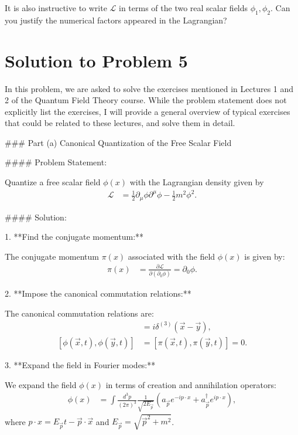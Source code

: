     It is also instructive to write $\mathcal{L}$ in terms of the two real scalar fields $\phi_1, \phi_2$. Can you justify the numerical factors appeared in the Lagrangian?
    
\bigskip\bigskip\hline\hline\bigskip
\section*{Solution to Problem 5}

In this problem, we are asked to solve the exercises mentioned in Lectures 1 and 2 of the Quantum Field Theory course. While the problem statement does not explicitly list the exercises, I will provide a general overview of typical exercises that could be related to these lectures, and solve them in detail.

### Part (a) Canonical Quantization of the Free Scalar Field

#### Problem Statement:

Quantize a free scalar field $\phi(x)$ with the Lagrangian density given by
\begin{align}
    \mathcal{L} &= \frac{1}{2} \partial_\mu \phi \partial^\mu \phi - \frac{1}{2} m^2 \phi^2.
\end{align}

#### Solution:

1. **Find the conjugate momentum:**

   The conjugate momentum $\pi(x)$ associated with the field $\phi(x)$ is given by:
   \begin{align}
       \pi(x) &= \frac{\partial \mathcal{L}}{\partial (\partial_0 \phi)} = \partial_0 \phi.
   \end{align}

2. **Impose the canonical commutation relations:**

   The canonical commutation relations are:
   \begin{align}
       [\phi(\vec{x}, t), \pi(\vec{y}, t)] &= i \delta^{(3)}(\vec{x} - \vec{y}), \\
       [\phi(\vec{x}, t), \phi(\vec{y}, t)] &= [\pi(\vec{x}, t), \pi(\vec{y}, t)] = 0.
   \end{align}

3. **Expand the field in Fourier modes:**

   We expand the field $\phi(x)$ in terms of creation and annihilation operators:
   \begin{align}
       \phi(x) &= \int \frac{d^3 p}{(2\pi)^3} \frac{1}{\sqrt{2 E_{\vec{p}}}} \left(a_{\vec{p}} e^{-ip \cdot x} + a_{\vec{p}}^\dagger e^{ip \cdot x}\right),
   \end{align}
   where $p \cdot x = E_{\vec{p}} t - \vec{p} \cdot \vec{x}$ and $E_{\vec{p}} = \sqrt{\vec{p}^2 + m^2}$.

